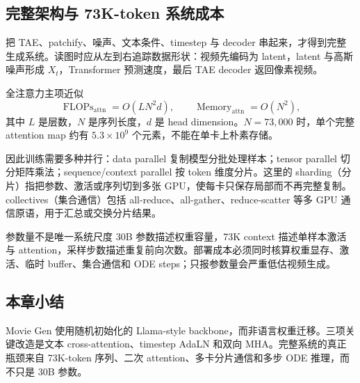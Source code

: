 \subsection{完整架构与 73K-token 系统成本}

把 TAE、patchify、噪声、文本条件、timestep 与 decoder 串起来，才得到完整生成系统。读图时应从左到右追踪数据形状：视频先编码为 latent，latent 与高斯噪声形成 $X_t$，Transformer 预测速度，最后 TAE decoder 返回像素视频。


全注意力主项近似
\[
\operatorname{FLOPs}_{\mathrm{attn}}=O(LN^2d),
\qquad
\operatorname{Memory}_{\mathrm{attn}}=O(N^2),
\]
其中 $L$ 是层数，$N$ 是序列长度，$d$ 是 head dimension。$N=73{,}000$ 时，单个完整 attention map 约有 $5.3\times10^9$ 个元素，不能在单卡上朴素存储。

因此训练需要多种并行：data parallel 复制模型分批处理样本；tensor parallel 切分矩阵乘法；sequence/context parallel 按 token 维度分片。这里的 sharding（分片）指把参数、激活或序列切到多张 GPU，使每卡只保存局部而不再完整复制。collectives（集合通信）包括 all-reduce、all-gather、reduce-scatter 等多 GPU 通信原语，用于汇总或交换分片结果。

\begin{warningbox}{参数量不是唯一系统尺度}
30B 参数描述权重容量，73K context 描述单样本激活与 attention，采样步数描述重复前向次数。部署成本必须同时核算权重显存、激活、临时 buffer、集合通信和 ODE steps；只报参数量会严重低估视频生成。
\end{warningbox}


\subsection{本章小结}

Movie Gen 使用随机初始化的 Llama-style backbone，而非语言权重迁移。三项关键改造是文本 cross-attention、timestep AdaLN 和双向 MHA。完整系统的真正瓶颈来自 73K-token 序列、二次 attention、多卡分片通信和多步 ODE 推理，而不只是 30B 参数。

